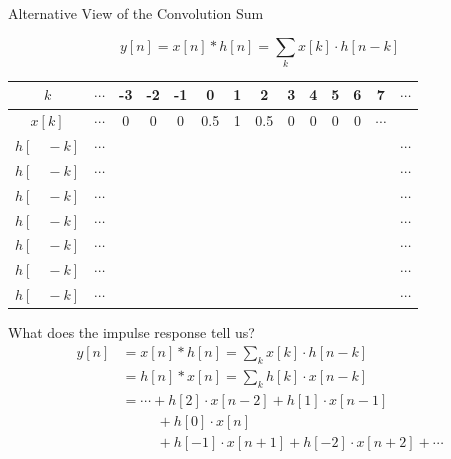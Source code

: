 \documentclass[aspectratio=169]{beamer}
\begin{document}
\begin{frame}[t]{Alternative View of the Convolution Sum}
\begin{Large}
\[ y[n] = x[n] * h[n] = \sum_k x[k] \cdot h[n - k] \]
\end{Large}
\begin{center}
\begin{tabu}{c|c|c|c|c|c|c|c|c|c|c|c|c|c}
\hline
$k$ & $\cdots$ & -3 &  -2 & -1 & 0 & 1 & 2 & 3 & 4 & 5 & 6 & 7 & $\cdots$ \\ \hline
\rowfont{\color{red}} $x[k]$ & $\cdots$ & 0 & 0 & 0 & 0.5 & 1 & 0.5 & 0 & 0 & 0 & 0 & $\cdots$ &  \\ \hline
$h[\quad - k]$ & $\cdots$ &  &  &  &  &  &  &  &  &  &  &  & $\cdots$ \\ \hline
$h[\quad - k]$ & $\cdots$ &  &  &  &  &  &  &  &  &  &  &  & $\cdots$ \\ \hline
$h[\quad - k]$ & $\cdots$ &  &  &  &  &  &  &  &  &  &  &  & $\cdots$ \\ \hline
$h[\quad - k]$ & $\cdots$ &  &  &  &  &  &  &  &  &  &  &  & $\cdots$ \\ \hline
$h[\quad - k]$ & $\cdots$ &  &  &  &  &  &  &  &  &  &  &  & $\cdots$ \\ \hline
$h[\quad - k]$ & $\cdots$ &  &  &  &  &  &  &  &  &  &  &  & $\cdots$ \\ \hline
$h[\quad - k]$ & $\cdots$ &  &  &  &  &  &  &  &  &  &  &  & $\cdots$ \\ \hline
\end{tabu}
\end{center}
\end{frame}

\begin{frame}[t]{What does the impulse response tell us?}
\[
\begin{split}
y[n] &= x[n] * h[n] = \sum_k x[k] \cdot h[n - k] \\
     &= h[n] * x[n] = \sum_k h[k] \cdot x[n - k] \\
     &= \cdots + h[2] \cdot x[n-2] + h[1] \cdot x[n-1] \\
     &\quad \quad \,\,\, + h[0] \cdot x[n]\\
     &\quad \quad \,\,\, + h[-1] \cdot x[n + 1] + h[-2] \cdot x[n + 2] + \cdots
\end{split}
\]

\end{frame}

\end{document}
